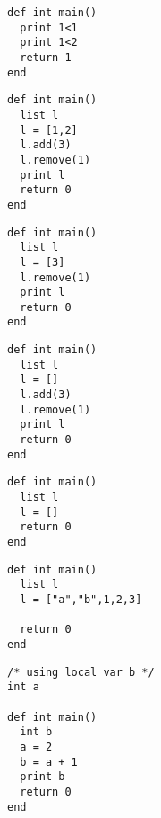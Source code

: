 \documentclass[11pt]{article}
\begin{document}
\begin{listing}[H]
  \begin{verbatim}
def int main()
  print 1<1
  print 1<2
  return 1
end
  \end{verbatim}
\end{listing}

\begin{listing}[H]
  \begin{verbatim}
def int main()
  list l
  l = [1,2]
  l.add(3)
  l.remove(1)
  print l
  return 0
end
  \end{verbatim}
\end{listing}

\begin{listing}[H]
  \begin{verbatim}
def int main()
  list l
  l = [3]
  l.remove(1)
  print l
  return 0
end
  \end{verbatim}
\end{listing}

\begin{listing}[H]
  \begin{verbatim}
def int main()
  list l
  l = []
  l.add(3)
  l.remove(1)
  print l
  return 0
end
  \end{verbatim}
\end{listing}

\begin{listing}[H]
  \begin{verbatim}
def int main()
  list l
  l = []
  return 0
end
  \end{verbatim}
\end{listing}

\begin{listing}[H]
  \begin{verbatim}
def int main()
  list l
  l = ["a","b",1,2,3]

  return 0
end
  \end{verbatim}
\end{listing}

\begin{listing}[H]
  \begin{verbatim}
/* using local var b */
int a

def int main()
  int b
  a = 2
  b = a + 1
  print b
  return 0
end
  \end{verbatim}
\end{listing}
\end{document}
